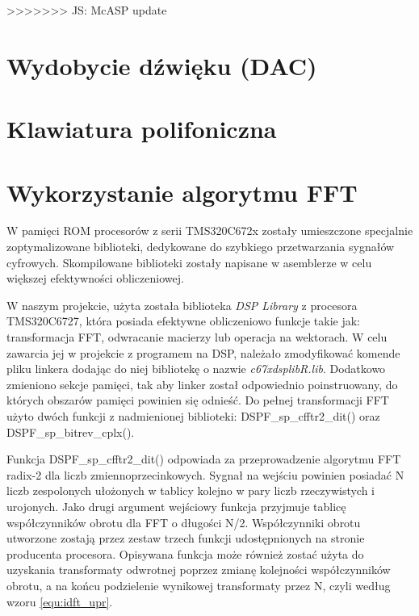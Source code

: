 >>>>>>> JS: McASP update
\section{Wydobycie dźwięku (DAC)}



\section{Klawiatura polifoniczna}




\section{Wykorzystanie algorytmu FFT}


W pamięci ROM procesorów z serii TMS320C672x zostały umieszczone specjalnie zoptymalizowane biblioteki, dedykowane do szybkiego przetwarzania sygnałów cyfrowych. Skompilowane biblioteki zostały napisane w asemblerze w celu większej efektywności obliczeniowej. 

W naszym projekcie, użyta została biblioteka \emph{DSP Library} z procesora TMS320C6727, która posiada efektywne obliczeniowo funkcje takie jak: transformacja FFT, odwracanie macierzy lub operacja na wektorach. W celu zawarcia jej w projekcie z programem na DSP, należało zmodyfikować komende pliku linkera dodając do niej bibliotekę o nazwie \emph{c67xdsplibR.lib}. Dodatkowo zmieniono sekcje pamięci, tak aby linker został odpowiednio poinstruowany, do których obszarów pamięci powinien się odnieść. Do pełnej transformacji FFT użyto dwóch funkcji z nadmienionej biblioteki: DSPF\_sp\_cfftr2\_dit() oraz DSPF\_sp\_bitrev\_cplx(). 

Funkcja DSPF\_sp\_cfftr2\_dit() odpowiada za przeprowadzenie algorytmu FFT radix-2 dla liczb zmiennoprzecinkowych. Sygnał na wejściu powinien posiadać N liczb zespolonych ułożonych w tablicy kolejno w pary liczb rzeczywistych i urojonych. Jako drugi argument wejściowy funkcja przyjmuje tablicę współczynników obrotu dla FFT o długości N/2. Współczynniki obrotu utworzone zostają przez zestaw trzech funkcji udostępnionych na stronie producenta procesora. %
Opisywana funkcja może również zostać użyta do uzyskania transformaty odwrotnej poprzez zmianę kolejności współczynników obrotu, a na końcu podzielenie wynikowej transformaty przez N, czyli według wzoru \ref{equ:idft_upr}.

